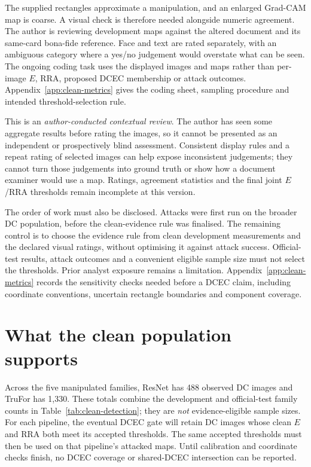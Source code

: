 The supplied rectangles approximate a manipulation, and an enlarged Grad-CAM map is coarse. A visual check is therefore needed alongside numeric agreement. The author is reviewing development maps against the altered document and its same-card bona-fide reference. Face and text are rated separately, with an ambiguous category where a yes/no judgement would overstate what can be seen. The ongoing coding task uses the displayed images and maps rather than per-image $E$, RRA, proposed DCEC membership or attack outcomes. Appendix~\ref{app:clean-metrics} gives the coding sheet, sampling procedure and intended threshold-selection rule.

This is an \emph{author-conducted contextual review}. The author has seen some aggregate results before rating the images, so it cannot be presented as an independent or prospectively blind assessment. Consistent display rules and a repeat rating of selected images can help expose inconsistent judgements; they cannot turn those judgements into ground truth or show how a document examiner would use a map. Ratings, agreement statistics and the final joint $E$/RRA thresholds remain incomplete at this version.

The order of work must also be disclosed. Attacks were first run on the broader DC population, before the clean-evidence rule was finalised. The remaining control is to choose the evidence rule from clean development measurements and the declared visual ratings, without optimising it against attack success. Official-test results, attack outcomes and a convenient eligible sample size must not select the thresholds. Prior analyst exposure remains a limitation. Appendix~\ref{app:clean-metrics} records the sensitivity checks needed before a DCEC claim, including coordinate conventions, uncertain rectangle boundaries and component coverage.

\section{What the clean population supports}
\label{sec:clean-populations}

Across the five manipulated families, ResNet has 488 observed DC images and TruFor has 1,330. These totals combine the development and official-test family counts in Table~\ref{tab:clean-detection}; they are \emph{not} evidence-eligible sample sizes. For each pipeline, the eventual DCEC gate will retain DC images whose clean $E$ and RRA both meet its accepted thresholds. The same accepted thresholds must then be used on that pipeline's attacked maps. Until calibration and coordinate checks finish, no DCEC coverage or shared-DCEC intersection can be reported.


